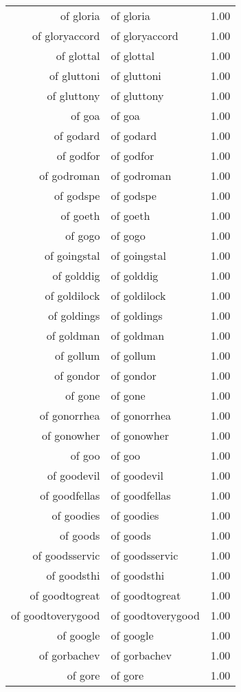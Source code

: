 \begin{table}[ht]
\begin{tabular}{rlr}
  of gloria & of gloria & 1.00 \\ 
  of gloryaccord & of gloryaccord & 1.00 \\ 
  of glottal & of glottal & 1.00 \\ 
  of gluttoni & of gluttoni & 1.00 \\ 
  of gluttony & of gluttony & 1.00 \\ 
  of goa & of goa & 1.00 \\ 
  of godard & of godard & 1.00 \\ 
  of godfor & of godfor & 1.00 \\ 
  of godroman & of godroman & 1.00 \\ 
  of godspe & of godspe & 1.00 \\ 
  of goeth & of goeth & 1.00 \\ 
  of gogo & of gogo & 1.00 \\ 
  of goingstal & of goingstal & 1.00 \\ 
  of golddig & of golddig & 1.00 \\ 
  of goldilock & of goldilock & 1.00 \\ 
  of goldings & of goldings & 1.00 \\ 
  of goldman & of goldman & 1.00 \\ 
  of gollum & of gollum & 1.00 \\ 
  of gondor & of gondor & 1.00 \\ 
  of gone & of gone & 1.00 \\ 
  of gonorrhea & of gonorrhea & 1.00 \\ 
  of gonowher & of gonowher & 1.00 \\ 
  of goo & of goo & 1.00 \\ 
  of goodevil & of goodevil & 1.00 \\ 
  of goodfellas & of goodfellas & 1.00 \\ 
  of goodies & of goodies & 1.00 \\ 
  of goods & of goods & 1.00 \\ 
  of goodsservic & of goodsservic & 1.00 \\ 
  of goodsthi & of goodsthi & 1.00 \\ 
  of goodtogreat & of goodtogreat & 1.00 \\ 
  of goodtoverygood & of goodtoverygood & 1.00 \\ 
  of google & of google & 1.00 \\ 
  of gorbachev & of gorbachev & 1.00 \\ 
  of gore & of gore & 1.00 \\ 

\end{tabular}
\end{table}
